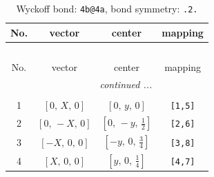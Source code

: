 \documentclass[fleqn,8pt]{jsarticle}
\begin{document}
\begin{longtable}{cccc}
\caption{Wyckoff bond: {\tt 4b@4a}, bond symmetry: {\tt .2.}}
 \\
 \hline \hline
No. & vector & center & mapping \\ \hline \endfirsthead

\multicolumn{3}{l}{\tablename\ \thetable{}} \\
 \hline \hline
No. & vector & center & mapping \\ \hline \endhead

 \hline \hline
\multicolumn{3}{r}{\footnotesize\it continued ...} \\ \endfoot

 \hline \hline
\multicolumn{3}{r}{} \\ \endlastfoot

1 & $\left[ 0,\, X,\, 0 \right]$ & $\left[ 0,\, y,\, 0 \right]$ & {\tt [1,5]} \\ \hline
2 & $\left[ 0,\, - X,\, 0 \right]$ & $\left[ 0,\, - y,\, \frac{1}{2} \right]$ & {\tt [2,6]} \\ \hline
3 & $\left[ - X,\, 0,\, 0 \right]$ & $\left[ - y,\, 0,\, \frac{3}{4} \right]$ & {\tt [3,8]} \\ \hline
4 & $\left[ X,\, 0,\, 0 \right]$ & $\left[ y,\, 0,\, \frac{1}{4} \right]$ & {\tt [4,7]} \\
\end{longtable}
\renewcommand{\arraystretch}{1.2}
\end{document}
